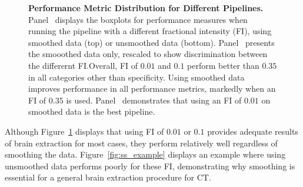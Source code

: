 \documentclass{elsarticle}\usepackage[]{graphicx}\usepackage[]{color}
\begin{document}
\begin{figure}
\hfill
\caption{{\bf Performance Metric Distribution for Different Pipelines.} Panel~\protect{} displays the boxplots for performance measures when running the pipeline with a different fractional intensity (FI), using smoothed data (top) or unsmoothed data (bottom).  Panel~\protect{} presents the smooothed data only, rescaled to show discrimination between the differernt FI.Overall, FI of $0.01$ and $0.1$ perform better than $0.35$ in all categories other than specificity.  Using smoothed data improves performance in all performance metrics, markedly when an FI of $0.35$ is used.  Panel~\protect{} demonstrates that using an FI of $0.01$ on smoothed data is the best pipeline.  }
\label{fig:metrics}
\end{figure}


Although Figure~\ref{fig:metrics} displays that using FI of $0.01$ or $0.1$ provides adequate results of brain extraction for most cases, they perform relatively well regardless of smoothing the data.  Figure~\ref{fig:ss_example} displays an example where using unsmoothed data performs poorly for these FI, demonstrating why smoothing is essential for a general brain extraction procedure for CT.
\end{document}

